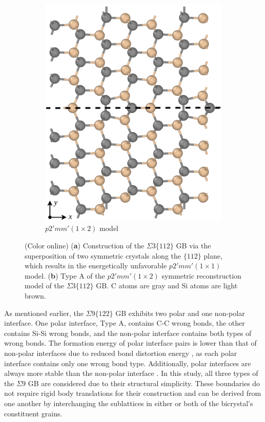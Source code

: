 \documentclass[%
preprint,
amsmath,amssymb,
aps,
]{revtex4-2}
\newcommand{\?}{\stackrel{?}{=}}
\begin{document}
\begin{figure}[h!]
\begin{subfigure}{0.3\textwidth}
 \includegraphics[width=\textwidth]{S3-2.png}
 \caption{$p2'mm' (1 \times 2)$ model}
 \label{Fig:S3-112-2}
\end{subfigure}
\caption{(Color online) (\textbf{a}) Construction of the $\Sigma 3 \{ 112 \}$ GB via the superposition of two symmetric crystals along the $\{112\}$ plane, which results in the energetically unfavorable $p2'mm' (1 \times 1)$ model. (\textbf{b}) Type A of the $p2'mm' (1 \times 2)$ symmetric reconstruction model of the $\Sigma 3 \{ 112 \}$ GB. C atoms are gray and Si atoms are light brown.}
\end{figure}

As mentioned earlier, the $\Sigma 9 \{122\}$ GB exhibits two polar and one non-polar interface. One polar interface, Type A, contains C-C wrong bonds, the other contains Si-Si wrong bonds, and the non-polar interface contains both types of wrong bonds. The formation energy of polar interface pairs is lower than that of non-polar interfaces due to reduced bond distortion energy \cite{Kohyama1991}, as each polar interface contains only one wrong bond type. Additionally, polar interfaces are always more stable than the non-polar interface \cite{Kohyama1991}. In this study, all three types of the $\Sigma 9$ GB are considered due to their structural simplicity. These boundaries do not require rigid body translations for their construction and can be derived from one another by interchanging the sublattices in either or both of the bicrystal's constituent grains.
\end{document}
